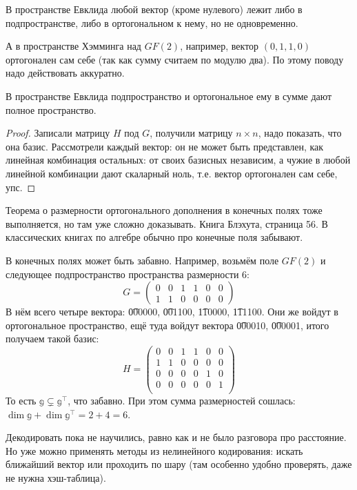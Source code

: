 \begin{Rem}
	В пространстве Евклида любой вектор (кроме нулевого)
	лежит либо в подпространстве,
	либо в ортогональном к нему, но не одновременно.

	А в пространстве Хэмминга над $GF(2)$, например, вектор $(0, 1, 1, 0)$
	ортогонален сам себе (так как сумму считаем по модулю два).
	По этому поводу надо действовать аккуратно.
\end{Rem}
\begin{lemma}
	В пространстве Евклида подпространство и ортогональное ему в сумме
	дают полное пространство.
\end{lemma}
\begin{proof}
	Записали матрицу $H$ под $G$, получили матрицу $n\times n$,
	надо показать, что она базис.
	\TODO
	Рассмотрели каждый вектор: он не может быть представлен, как линейная
	комбинация остальных: от своих базисных независим, а чужие в любой линейной
	комбинации дают скаларный ноль, т.е. вектор ортогонален сам себе, упс.
\end{proof}
\begin{Rem}
	Теорема о размерности ортогонального дополнения в конечных
	полях тоже выполняется, но там уже сложно доказывать.
	Книга Блэхута, страница 56.
	В классических книгах по алгебре обычно про конечные поля забывают.
\end{Rem}
\begin{Rem}
	В конечных полях может быть забавно.
	Например, возьмём поле $GF(2)$ и следующее подпространство пространства размерности 6:
	\[
	G=
	\begin{pmatrix}
	0 & 0 & 1 & 1 & 0 & 0 \\
	1 & 1 & 0 & 0 & 0 & 0
	\end{pmatrix}
	\]
	В нём всего четыре вектора: \t{000000}, \t{001100}, \t{110000}, \t{111100}.
	Они же войдут в ортогональное пространство,
	ещё туда войдут вектора \t{000010}, \t{000001}, итого получаем такой базис:
	\[
	H=
	\begin{pmatrix}
	0 & 0 & 1 & 1 & 0 & 0 \\
	1 & 1 & 0 & 0 & 0 & 0 \\
	0 & 0 & 0 & 0 & 1 & 0 \\
	0 & 0 & 0 & 0 & 0 & 1 \\
	\end{pmatrix}
	\]
	То есть $\mathbb g \subsetneq \mathbb g^\top$, что забавно.
	При этом сумма размерностей сошлась: $\dim \mathbb g + \dim \mathbb g^\top = 2 + 4 = 6$.
\end{Rem}

Декодировать пока не научились, равно как и не было разговора про расстояние.
Но уже можно применять методы из нелинейного кодирования: искать ближайший вектор
или проходить по шару (там особенно удобно проверять, даже не нужна хэш-таблица).
